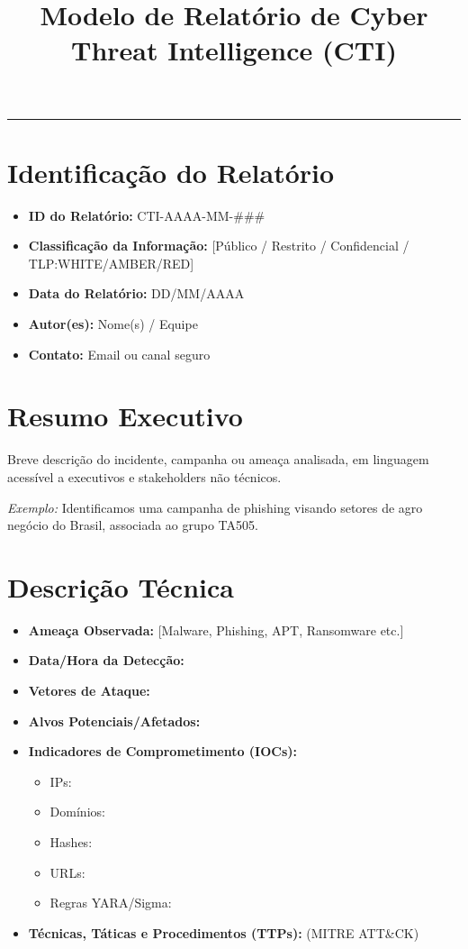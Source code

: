 \documentclass[12pt]{article}
\title{\textbf{Modelo de Relatório de Cyber Threat Intelligence (CTI)}}
\author{}
\date{}
\begin{document}
\maketitle
\hrule
\vspace{0.5cm}

\section{Identificação do Relatório}
\begin{itemize}[leftmargin=*]
    \item \textbf{ID do Relatório:} CTI-AAAA-MM-\#\#\#
    \item \textbf{Classificação da Informação:} [Público / Restrito / Confidencial / TLP:WHITE/AMBER/RED]
    \item \textbf{Data do Relatório:} DD/MM/AAAA
    \item \textbf{Autor(es):} Nome(s) / Equipe
    \item \textbf{Contato:} Email ou canal seguro
\end{itemize}

\section{Resumo Executivo}
Breve descrição do incidente, campanha ou ameaça analisada, em linguagem acessível a executivos e stakeholders não técnicos.

\textit{Exemplo:} Identificamos uma campanha de phishing visando setores de agro negócio do Brasil, associada ao grupo TA505.

\section{Descrição Técnica}
\begin{itemize}[leftmargin=*]
    \item \textbf{Ameaça Observada:} [Malware, Phishing, APT, Ransomware etc.]
    \item \textbf{Data/Hora da Detecção:} 
    \item \textbf{Vetores de Ataque:} 
    \item \textbf{Alvos Potenciais/Afetados:} 
    \item \textbf{Indicadores de Comprometimento (IOCs):}
    \begin{itemize}
        \item IPs:
        \item Domínios:
        \item Hashes:
        \item URLs:
        \item Regras YARA/Sigma:
    \end{itemize}
    \item \textbf{Técnicas, Táticas e Procedimentos (TTPs):} (MITRE ATT\&CK)
\end{itemize}
\end{document}

